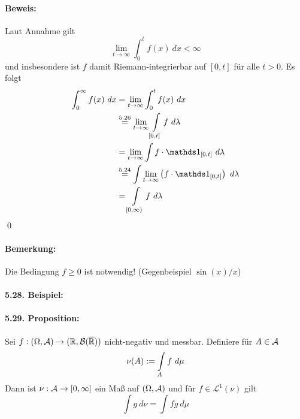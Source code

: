 \documentclass[12pt]{report}
\begin{document}
 \paragraph{Beweis:}Laut Annahme gilt
 $$\lim_{t\to\infty}\int_0^tf(x)\ dx<\infty$$
 und insbesondere ist $f$ damit Riemann-integrierbar auf $[0,t]$ f\"ur alle $t>0$. Es folgt
 \begin{align*}
     \int_0^\infty f(x)\ dx&=\lim_{t\to\infty}\int_0^tf(x)\ dx\\&\overset{5.26}{=}\lim_{t\to\infty}\int\displaylimits_{[0,t]}f\ d\lambda\\
     &=\lim_{t\to\infty}\int f\cdot\ind{[0,t]}\ d\lambda\\
     &\overset{5.24}{=}\int \lim_{t\to\infty}\left(f\cdot\ind{[0,t]}\right)\ d\lambda\\
     &=\int\displaylimits_{[0,\infty)}f\ d\lambda
 \end{align*} 
 \qed
 
 \paragraph{Bemerkung:}Die Bedingung $f\geq0$ ist notwendig! (Gegenbeispiel $\sin (x)/x$)
 
 \paragraph{5.28. Beispiel:} %
 
 \paragraph{5.29. Proposition:}Sei $f:(\Omega,\mathcal{A})\to(\mathbb{R},\mathcal{B}(\overline{\mathbb{R}}))$ nicht-negativ und messbar. Definiere f\"ur $A\in\mathcal{A}$ 
 $$\nu(A):=\int\displaylimits_A f\ d\mu$$
 Dann ist $\nu:\mathcal{A}\to[0,\infty]$ ein Ma\ss{} auf $(\Omega,\mathcal{A})$ und f\"ur $f\in\mathcal{L}^1(\nu)$ gilt
 $$\int g\ d\nu=\int fg\ d\mu$$
 
\end{document}
